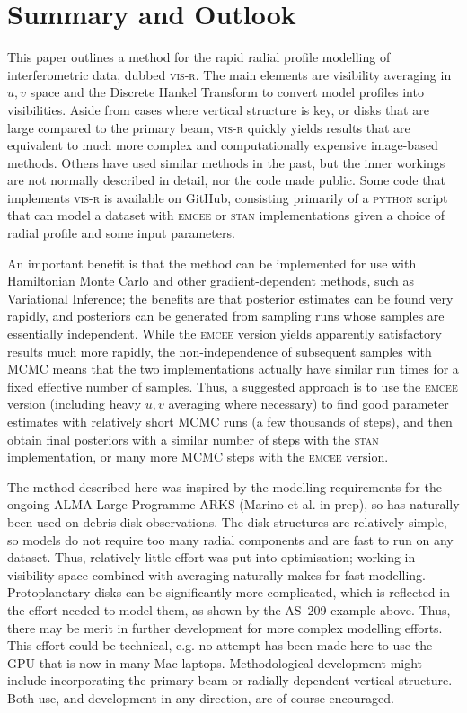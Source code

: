 \documentclass[fleqn,usenatbib]{mnras}
\begin{document}
\section{Summary and Outlook}

This paper outlines a method for the rapid radial profile modelling of interferometric data, dubbed \textsc{vis-r}. The main elements are visibility averaging in $u,v$ space and the Discrete Hankel Transform to convert model profiles into visibilities. Aside from cases where vertical structure is key, or disks that are large compared to the primary beam, \textsc{vis-r} quickly yields results that are equivalent to much more complex and computationally expensive image-based methods. Others have used similar methods in the past, but the inner workings are not normally described in detail, nor the code made public. Some code that implements \textsc{vis-r} is available on GitHub, consisting primarily of a \textsc{python} script that can model a dataset with \textsc{emcee} or \textsc{stan} implementations given a choice of radial profile and some input parameters.

An important benefit is that the method can be implemented for use with Hamiltonian Monte Carlo and other gradient-dependent methods, such as Variational Inference; the benefits are that posterior estimates can be found very rapidly, and posteriors can be generated from sampling runs whose samples are essentially independent. While the \textsc{emcee} version yields apparently satisfactory results much more rapidly, the non-independence of subsequent samples with MCMC means that the two implementations actually have similar run times for a fixed effective number of samples. Thus, a suggested approach is to use the \textsc{emcee} version (including heavy $u,v$ averaging where necessary) to find good parameter estimates with relatively short MCMC runs (a few thousands of steps), and then obtain final posteriors with a similar number of steps with the \textsc{stan} implementation, or many more MCMC steps with the \textsc{emcee} version.

The method described here was inspired by the modelling requirements for the ongoing ALMA Large Programme ARKS (Marino et al. in prep), so has naturally been used on debris disk observations. The disk structures are relatively simple, so models do not require too many radial components and are fast to run on any dataset. Thus, relatively little effort was put into optimisation; working in visibility space combined with averaging naturally makes for fast modelling. Protoplanetary disks can be significantly more complicated, which is reflected in the effort needed to model them, as shown by the AS~209 example above. Thus, there may be merit in further development for more complex modelling efforts. This effort could be technical, e.g. no attempt has been made here to use the GPU that is now in many Mac laptops. Methodological development might include incorporating the primary beam or radially-dependent vertical structure. Both use, and development in any direction, are of course encouraged.
\end{document}

